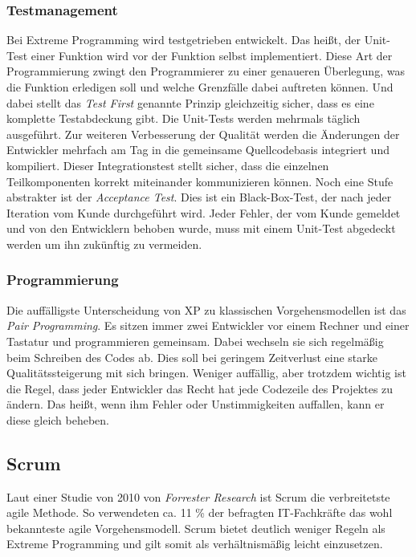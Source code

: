 \subsubsection{Testmanagement}
Bei Extreme Programming wird testgetrieben entwickelt. Das heißt, der Unit-Test einer Funktion wird vor der Funktion selbst implementiert. Diese Art der Programmierung zwingt den Programmierer zu einer genaueren Überlegung, was die Funktion erledigen soll und welche Grenzfälle dabei auftreten können. Und dabei stellt das \emph{Test First} genannte Prinzip gleichzeitig sicher, dass es eine komplette Testabdeckung gibt. Die Unit-Tests werden mehrmals täglich ausgeführt. Zur weiteren Verbesserung der Qualität werden die Änderungen der Entwickler mehrfach am Tag in die gemeinsame Quellcodebasis integriert und kompiliert. Dieser Integrationstest stellt sicher, dass die einzelnen Teilkomponenten korrekt miteinander kommunizieren können. Noch eine Stufe abstrakter ist der \emph{Acceptance Test}. Dies ist ein Black-Box-Test, der nach jeder Iteration vom Kunde durchgeführt wird. Jeder Fehler, der vom Kunde gemeldet und von den Entwicklern behoben wurde, muss mit einem Unit-Test abgedeckt werden um ihn zukünftig zu vermeiden.

\subsubsection{Programmierung}
Die auffälligste Unterscheidung von XP zu klassischen Vorgehensmodellen ist das \emph{Pair Programming}. Es sitzen immer zwei Entwickler vor einem Rechner und einer Tastatur und programmieren gemeinsam. Dabei wechseln sie sich regelmäßig beim Schreiben des Codes ab. Dies soll bei geringem Zeitverlust eine starke Qualitätssteigerung mit sich bringen. Weniger auffällig, aber trotzdem wichtig ist die Regel, dass jeder Entwickler das Recht hat jede Codezeile des Projektes zu ändern. Das heißt, wenn ihm Fehler oder Unstimmigkeiten auffallen, kann er diese gleich beheben.

\subsection{Scrum}
\label{ch:scrum}
Laut einer Studie von 2010 von \emph{Forrester Research} ist Scrum die verbreitetste agile Methode. So verwendeten ca. 11 \% der befragten IT-Fach\-kräfte das wohl bekannteste agile Vorgehensmodell. \cite{bib:ane} Scrum bietet deutlich weniger Regeln als Extreme Programming und gilt somit als verhältnismäßig leicht einzusetzen. 

